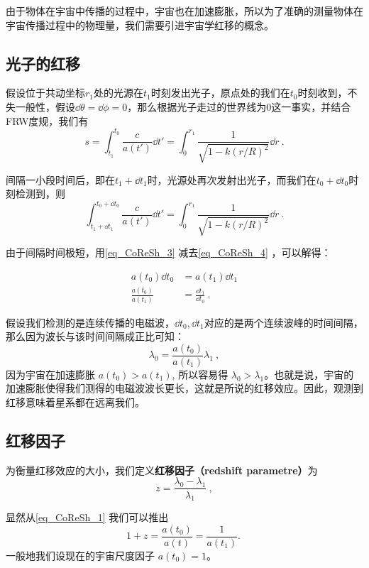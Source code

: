 \begin{issues}
\issueMissDepend
\end{issues}

由于物体在宇宙中传播的过程中，宇宙也在加速膨胀，所以为了准确的测量物体在宇宙传播过程中的物理量，我们需要引进宇宙学红移的概念。

\subsection{光子的红移}
假设位于共动坐标$r_1$处的光源在$t_1$时刻发出光子，原点处的我们在$t_0$时刻收到，不失一般性，假设$\dd\theta=\dd\phi=0$，那么根据光子走过的世界线为$0$这一事实，并结合FRW度规，我们有
\begin{equation}\label{eq_CoReSh_4}
s=\int^{t_0}_{t_1}\frac{c}{a(t')}\dd t'=\int_0^{r_1}\frac{1}{\sqrt{1-k(r/R)^2}}\dd r~.
\end{equation}

间隔一小段时间后，即在$t_1+\dd t_1$时，光源处再次发射出光子，而我们在$t_0+\dd t_0$时刻检测到，则
\begin{equation}\label{eq_CoReSh_3}
\int^{t_0+\dd t_0}_{t_1+\dd t_1}\frac{c}{a(t')}\dd t'=\int_0^{r_1}\frac{1}{\sqrt{1-k(r/R)^2}}\dd r~.
\end{equation}

由于间隔时间极短，用\autoref{eq_CoReSh_3} 减去\autoref{eq_CoReSh_4} ，可以解得：

\begin{equation}
\begin{aligned}
a(t_0)\dd t_0&=a(t_1)\dd t_1\\
\frac{a(t_0)}{a(t_1)}&=\frac{\dd t_1}{\dd t_0}~.
\end{aligned}
\end{equation}

假设我们检测的是连续传播的电磁波，$\dd t_0,\dd t_1$对应的是两个连续波峰的时间间隔，那么因为波长与该时间间隔成正比可知：
\begin{equation}\label{eq_CoReSh_1}
\lambda_0=\frac{a(t_0)}{a(t_1)}\lambda_1~,
\end{equation}
因为宇宙在加速膨胀 $a(t_0)>a(t_1)$, 所以容易得 $\lambda_0>\lambda_1$。也就是说，宇宙的加速膨胀使得我们测得的电磁波波长更长，这就是所说的红移效应。因此，观测到红移意味着星系都在远离我们。


\subsection{红移因子}
\begin{definition}{}
为衡量红移效应的大小，我们定义\textbf{红移因子（redshift parametre）}为
\begin{equation}
z=\frac{\lambda_0-\lambda_1}{\lambda_1}~,
\end{equation}
\end{definition}
显然从\autoref{eq_CoReSh_1} 我们可以推出
\begin{equation}
1+z=\frac{a(t_0)}{a(t)}=\frac{1}{a(t_1)}. \label{eq_CoReSh_2}~
\end{equation}
一般地我们设现在的宇宙尺度因子 $a(t_0)=1$。

